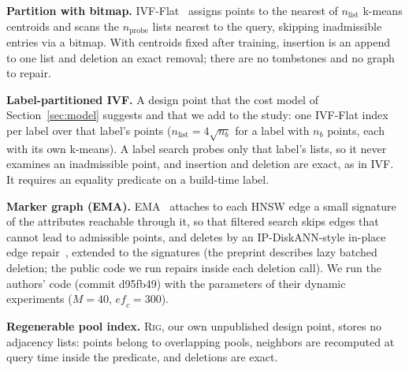 \documentclass[conference]{IEEEtran}
\newcommand{\rig}{\textsc{Rig}}
\begin{document}
\textbf{Partition with bitmap.} IVF-Flat~\cite{faiss} assigns points to the nearest of $n_{\text{list}}$ k-means centroids and scans the $n_{\text{probe}}$ lists nearest to the query, skipping inadmissible entries via a bitmap. With centroids fixed after training, insertion is an append to one list and deletion an exact removal; there are no tombstones and no graph to repair.

\textbf{Label-partitioned IVF.} A design point that the cost model of Section~\ref{sec:model} suggests and that we add to the study: one IVF-Flat index per label over that label's points ($n_{\text{list}}=4\sqrt{n_b}$ for a label with $n_b$ points, each with its own k-means). A label search probes only that label's lists, so it never examines an inadmissible point, and insertion and deletion are exact, as in IVF. It requires an equality predicate on a build-time label.

\textbf{Marker graph (EMA).} EMA~\cite{ema} attaches to each HNSW edge a small signature of the attributes reachable through it, so that filtered search skips edges that cannot lead to admissible points, and deletes by an IP-DiskANN-style in-place edge repair~\cite{ipdiskann}, extended to the signatures (the preprint describes lazy batched deletion; the public code we run repairs inside each deletion call). We run the authors' code (commit d95fb49) with the parameters of their dynamic experiments ($M{=}40$, $\mathit{ef}_c{=}300$).

\textbf{Regenerable pool index.} \rig{}, our own unpublished design point, stores no adjacency lists: points belong to overlapping pools, neighbors are recomputed at query time inside the predicate, and deletions are exact.
\end{document}

